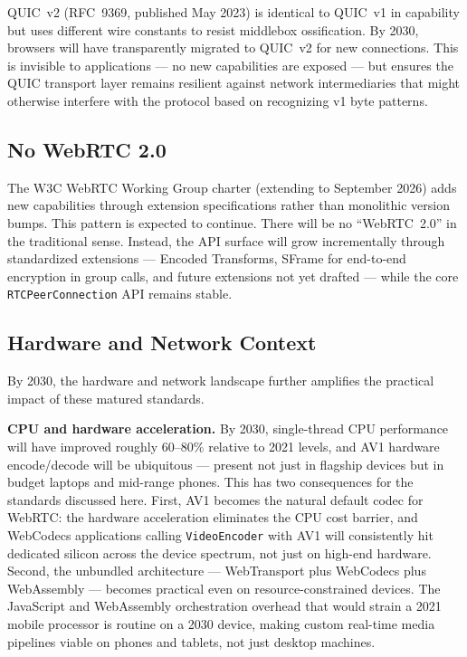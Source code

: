 \documentclass[11pt]{article}
\begin{document}
QUIC~v2 (RFC~9369, published May 2023) is identical to QUIC~v1 in capability
but uses different wire constants to resist middlebox ossification. By 2030,
browsers will have transparently migrated to QUIC~v2 for new connections.
This is invisible to applications --- no new capabilities are exposed --- but
ensures the QUIC transport layer remains resilient against network
intermediaries that might otherwise interfere with the protocol based on
recognizing v1 byte patterns.

\subsection{No WebRTC 2.0}

The W3C WebRTC Working Group charter (extending to September 2026) adds new
capabilities through extension specifications rather than monolithic version
bumps. This pattern is expected to continue. There will be no ``WebRTC~2.0''
in the traditional sense. Instead, the API surface will grow incrementally
through standardized extensions --- Encoded Transforms, SFrame for
end-to-end encryption in group calls, and future extensions not yet drafted
--- while the core \texttt{RTCPeerConnection} API remains stable.

\subsection{Hardware and Network Context}

By 2030, the hardware and network landscape further amplifies the practical
impact of these matured standards.

\textbf{CPU and hardware acceleration.} By 2030, single-thread CPU
performance will have improved roughly 60--80\% relative to 2021 levels,
and AV1 hardware encode/decode will be ubiquitous --- present not just in
flagship devices but in budget laptops and mid-range phones. This has two
consequences for the standards discussed here. First, AV1 becomes the
natural default codec for WebRTC: the hardware acceleration eliminates the
CPU cost barrier, and WebCodecs applications calling \texttt{VideoEncoder}
with AV1 will consistently hit dedicated silicon across the device spectrum,
not just on high-end hardware. Second, the unbundled architecture ---
WebTransport plus WebCodecs plus WebAssembly --- becomes practical even on
resource-constrained devices. The JavaScript and WebAssembly orchestration
overhead that would strain a 2021 mobile processor is routine on a 2030
device, making custom real-time media pipelines viable on phones and tablets,
not just desktop machines.
\end{document}
